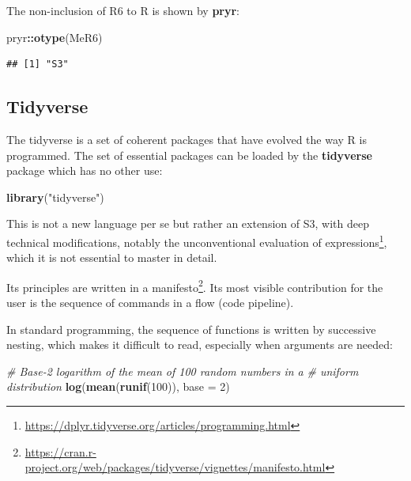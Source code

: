 \documentclass[
  12pt,
  american,
  a4paper,
  extrafontsizes,onecolumn,openright
  ]{memoir}
\newenvironment{Shaded}{\begin{snugshade}}{\end{snugshade}}
\newcommand{\AttributeTok}[1]{\textcolor[rgb]{0.13,0.29,0.53}{#1}}
\newcommand{\CommentTok}[1]{\textcolor[rgb]{0.56,0.35,0.01}{\textit{#1}}}
\newcommand{\DecValTok}[1]{\textcolor[rgb]{0.00,0.00,0.81}{#1}}
\newcommand{\FunctionTok}[1]{\textcolor[rgb]{0.13,0.29,0.53}{\textbf{#1}}}
\newcommand{\NormalTok}[1]{#1}
\newcommand{\SpecialCharTok}[1]{\textcolor[rgb]{0.81,0.36,0.00}{\textbf{#1}}}
\newcommand{\StringTok}[1]{\textcolor[rgb]{0.31,0.60,0.02}{#1}}
\begin{document}
The non-inclusion of R6 to R is shown by \textbf{pryr}:

\scriptsize

\begin{Shaded}
\begin{Highlighting}[]
\NormalTok{pryr}\SpecialCharTok{::}\FunctionTok{otype}\NormalTok{(MeR6)}
\end{Highlighting}
\end{Shaded}

\begin{verbatim}
## [1] "S3"
\end{verbatim}

\normalsize

\subsection{Tidyverse}\label{tidyverse}

The tidyverse is a set of coherent packages that have evolved the way R is programmed.
The set of essential packages can be loaded by the \textbf{tidyverse} package which has no other use:

\scriptsize

\begin{Shaded}
\begin{Highlighting}[]
\FunctionTok{library}\NormalTok{(}\StringTok{"tidyverse"}\NormalTok{)}
\end{Highlighting}
\end{Shaded}

\normalsize

This is not a new language per se but rather an extension of S3, with deep technical modifications, notably the unconventional evaluation of expressions\footnote{\url{https://dplyr.tidyverse.org/articles/programming.html}}, which it is not essential to master in detail.

Its principles are written in a manifesto\footnote{\url{https://cran.r-project.org/web/packages/tidyverse/vignettes/manifesto.html}}.
Its most visible contribution for the user is the sequence of commands in a flow (code pipeline).

In standard programming, the sequence of functions is written by successive nesting, which makes it difficult to read, especially when arguments are needed:

\scriptsize

\begin{Shaded}
\begin{Highlighting}[]
\CommentTok{\# Base{-}2 logarithm of the mean of 100 random numbers in a}
\CommentTok{\# uniform distribution}
\FunctionTok{log}\NormalTok{(}\FunctionTok{mean}\NormalTok{(}\FunctionTok{runif}\NormalTok{(}\DecValTok{100}\NormalTok{)), }\AttributeTok{base =} \DecValTok{2}\NormalTok{)}
\end{Highlighting}
\end{Shaded}
\end{document}
